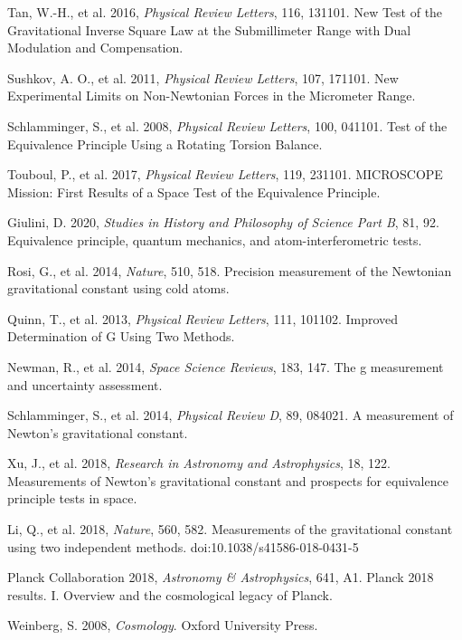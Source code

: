 \documentclass[fleqn,usenatbib]{mnras}
\begin{document}
\begin{thebibliography}{99}
 Tan, W.-H., et al. 2016, \textit{Physical Review Letters}, 116, 131101. New Test of the Gravitational Inverse Square Law at the Submillimeter Range with Dual Modulation and Compensation.

 Sushkov, A. O., et al. 2011, \textit{Physical Review Letters}, 107, 171101. New Experimental Limits on Non-Newtonian Forces in the Micrometer Range.

 Schlamminger, S., et al. 2008, \textit{Physical Review Letters}, 100, 041101. Test of the Equivalence Principle Using a Rotating Torsion Balance.

 Touboul, P., et al. 2017, \textit{Physical Review Letters}, 119, 231101. MICROSCOPE Mission: First Results of a Space Test of the Equivalence Principle.

 Giulini, D. 2020, \textit{Studies in History and Philosophy of Science Part B}, 81, 92. Equivalence principle, quantum mechanics, and atom-interferometric tests.

 Rosi, G., et al. 2014, \textit{Nature}, 510, 518. Precision measurement of the Newtonian gravitational constant using cold atoms.

 Quinn, T., et al. 2013, \textit{Physical Review Letters}, 111, 101102. Improved Determination of G Using Two Methods.

 Newman, R., et al. 2014, \textit{Space Science Reviews}, 183, 147. The g measurement and uncertainty assessment.

 Schlamminger, S., et al. 2014, \textit{Physical Review D}, 89, 084021. A measurement of Newton's gravitational constant.

 Xu, J., et al. 2018, \textit{Research in Astronomy and Astrophysics}, 18, 122. Measurements of Newton's gravitational constant and prospects for equivalence principle tests in space.

 Li, Q., et al. 2018, \textit{Nature}, 560, 582. Measurements of the gravitational constant using two independent methods. doi:10.1038/s41586-018-0431-5

 Planck Collaboration 2018, \textit{Astronomy \& Astrophysics}, 641, A1. Planck 2018 results. I. Overview and the cosmological legacy of Planck.

 Weinberg, S. 2008, \textit{Cosmology}. Oxford University Press.


\end{thebibliography}
\end{document}
